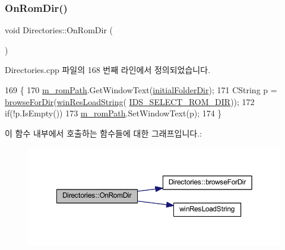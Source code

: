 \subsubsection{\texorpdfstring{On\+Rom\+Dir()}{OnRomDir()}}
{\footnotesize\ttfamily void Directories\+::\+On\+Rom\+Dir (\begin{DoxyParamCaption}{ }\end{DoxyParamCaption})\hspace{0.3cm}{\ttfamily [protected]}}



Directories.\+cpp 파일의 168 번째 라인에서 정의되었습니다.


\begin{DoxyCode}
169 \{
170   \mbox{\hyperlink{class_directories_a2d5fa2646d8216ec7f2093073174ab38}{m\_romPath}}.GetWindowText(\mbox{\hyperlink{class_directories_a5f307fd959af44c194c520b5452cafba}{initialFolderDir}});
171   CString p = \mbox{\hyperlink{class_directories_a7e24bf265fe6af9c01e0939952c337e1}{browseForDir}}(\mbox{\hyperlink{_win_res_util_8cpp_a416e85e80ab9b01376e87251c83d1a5a}{winResLoadString}}(
      \mbox{\hyperlink{resource_8h_ac7ad8d2bd13949a3e3f83005e3b2af6b}{IDS\_SELECT\_ROM\_DIR}}));
172   \textcolor{keywordflow}{if}(!p.IsEmpty())
173     \mbox{\hyperlink{class_directories_a2d5fa2646d8216ec7f2093073174ab38}{m\_romPath}}.SetWindowText(p);
174 \}
\end{DoxyCode}
이 함수 내부에서 호출하는 함수들에 대한 그래프입니다.\+:
\nopagebreak
\begin{figure}[H]
\begin{center}
\leavevmode
\includegraphics[width=350pt]{class_directories_a0ed6f361bde84a4a6a37c41582a929ec_cgraph}
\end{center}
\end{figure}
\mbox{\label{class_directories_a944a8a843ab8f0cdec54bf8aaba7d8a5}} 

